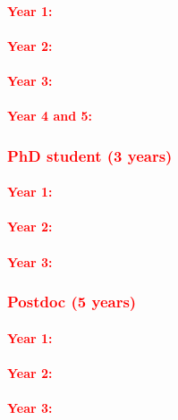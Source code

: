 \documentclass[a4paper,11pt,numbers=noenddot,parskip=half-]{scrreprt}
\begin{document}
\paragraph*{\textcolor{red}{Year 1:}}
\myblindtext
\paragraph*{\textcolor{red}{Year 2:}}
\myblindtext
\paragraph*{\textcolor{red}{Year 3:}}
\myblindtext
\paragraph*{\textcolor{red}{Year 4 and 5:}}
\myblindtext


\subsubsection{\textcolor{red}{PhD student (3 years)}}\label{sec:phd}
\paragraph*{\textcolor{red}{Year 1:}}
\myblindtext
\paragraph*{\textcolor{red}{Year 2:}}
\myblindtext
\paragraph*{\textcolor{red}{Year 3:}}
\myblindtext

\subsubsection{\textcolor{red}{Postdoc (5 years)}}
\paragraph*{\textcolor{red}{Year 1:}}
\myblindtext
\paragraph*{\textcolor{red}{Year 2:}}
\myblindtext
\paragraph*{\textcolor{red}{Year 3:}}
\myblindtext
\end{document}
